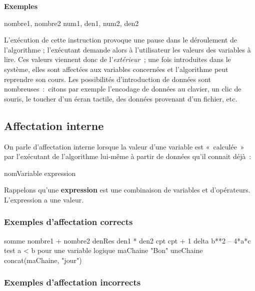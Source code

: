 			{\bfseries Exemples}
			
			\begin{Pseudocode}
			\Read nombre1, nombre2
			\Read num1, den1, num2, den2
			\end{Pseudocode}
			
			L’exécution de cette instruction provoque une
			pause dans le déroulement de l’algorithme ; 
			l’exécutant demande alors à l’utilisateur 
			les valeurs des variables à lire. 
			Ces valeurs viennent donc de l’\textit{extérieur~}; 
			une fois introduites dans le système,
			elles sont affectées aux variables concernées 
			et l’algorithme peut reprendre son cours. 
			Les possibilités d’introduction de données 
			sont nombreuses~:~citons par exemple l’encodage de
			données au clavier, un clic de souris, le toucher d’un
			écran tactile, des données provenant d’un fichier, etc.

		\subsection{Affectation interne}\label{affinterne}

			On parle d’affectation interne lorsque la valeur d’une variable est
			«~calculée~» par l’exécutant de l’algorithme lui-même à partir de
			données qu’il connait déjà~:

			\begin{Pseudocode}
			\Let nomVariable \Gets expression
			\end{Pseudocode}
			
			Rappelons qu’une \textbf{expression} 
			est une combinaison de variables et
			d’opérateurs. L’expression a une valeur.
			
			\subsubsection*{Exemples d’affectation corrects}
			
			\begin{Pseudocode}
			\Let somme \Gets nombre1 + nombre2
			\Let denRes \Gets den1 * den2
			\Let cpt \Gets cpt + 1
			\Let delta \Gets b**2 – 4*a*c
			\Let test \Gets a < b \RComment pour une variable logique
			\Let maChaine \Gets "Bon"
			\Let uneChaine \Gets concat(maChaine, "jour")
			\end{Pseudocode}
			
			\subsubsection*{Exemples d’affectation incorrects}
			

